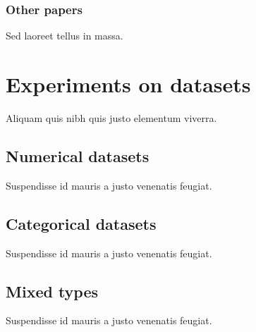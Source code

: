 \documentclass[a4paper,11pt]{kth-mag}
\begin{document}
\subsection{Other papers}
Sed laoreet tellus in massa.

\chapter{Experiments on datasets}
Aliquam quis nibh quis justo elementum viverra.

\section{Numerical datasets}
Suspendisse id mauris a justo venenatis feugiat.

\section{Categorical datasets}
Suspendisse id mauris a justo venenatis feugiat.

\section{Mixed types}
Suspendisse id mauris a justo venenatis feugiat.
\end{document}
